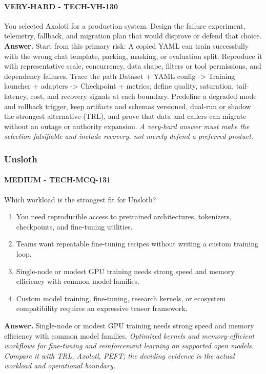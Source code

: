 \paragraph{VERY-HARD - TECH-VH-130} You selected Axolotl for a production system. Design the failure experiment, telemetry, fallback, and migration plan that would disprove or defend that choice.
\textbf{Answer.} Start from this primary risk: A copied YAML can train successfully with the wrong chat template, packing, masking, or evaluation split. Reproduce it with representative scale, concurrency, data shape, filters or tool permissions, and dependency failures. Trace the path Dataset + YAML config -> Training launcher + adapters -> Checkpoint + metrics; define quality, saturation, tail-latency, cost, and recovery signals at each boundary. Predefine a degraded mode and rollback trigger, keep artifacts and schemas versioned, dual-run or shadow the strongest alternative (TRL), and prove that data and callers can migrate without an outage or authority expansion.
\textit{A very-hard answer must make the selection falsifiable and include recovery, not merely defend a preferred product.}
\subsubsection*{Unsloth}
\paragraph{MEDIUM - TECH-MCQ-131} Which workload is the strongest fit for Unsloth?
\begin{enumerate}[label=\Alph*.]
\item You need reproducible access to pretrained architectures, tokenizers, checkpoints, and fine-tuning utilities.
\item Teams want repeatable fine-tuning recipes without writing a custom training loop.
\item Single-node or modest GPU training needs strong speed and memory efficiency with common model families.
\item Custom model training, fine-tuning, research kernels, or ecosystem compatibility requires an expressive tensor framework.
\end{enumerate}
\textbf{Answer.} Single-node or modest GPU training needs strong speed and memory efficiency with common model families.
\textit{Optimized kernels and memory-efficient workflows for fine-tuning and reinforcement learning on supported open models. Compare it with TRL, Axolotl, PEFT; the deciding evidence is the actual workload and operational boundary.}
